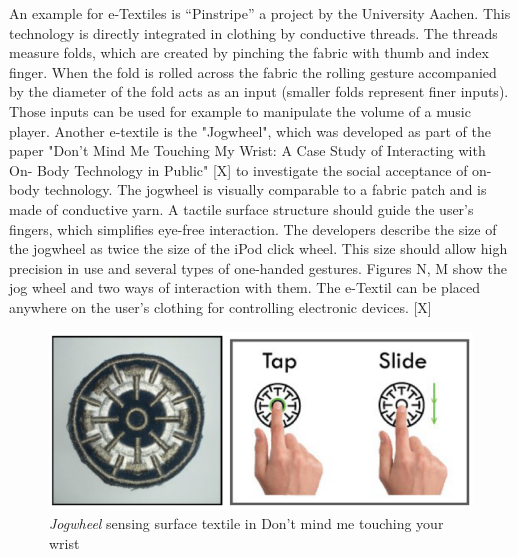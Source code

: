 \documentclass{sigchi}
\begin{document}
An example for e-Textiles is “Pinstripe” a project by the University Aachen. This technology is directly integrated in clothing by conductive threads. The threads measure folds, which are created by pinching the fabric with thumb and index finger. When the fold is rolled across the fabric the rolling gesture accompanied by the diameter of the fold acts as an input (smaller folds represent finer inputs). Those inputs can be used for example to manipulate the volume of a music player.
Another e-textile is the "Jogwheel", which was developed as part of the paper "Don't Mind Me Touching My Wrist: A Case Study of Interacting with On- Body Technology in Public" [X] to investigate the social acceptance of on-body technology. The jogwheel is visually comparable to a fabric patch and is made of conductive yarn. A tactile surface structure should guide the user's fingers, which simplifies eye-free interaction. The developers describe the size of the jogwheel as twice the size of the iPod click wheel. This size should allow high precision in use and several types of one-handed gestures. Figures N, M show the jog wheel and two ways of interaction with them. The e-Textil can be placed anywhere on the user's clothing for controlling electronic devices. [X]
\begin{figure}
  \includegraphics[width=\columnwidth]{jogwheel.png}
  \caption{\emph{Jogwheel} sensing surface textile in Don't mind me touching your wrist}
\end{figure}
%
%
\end{document}
